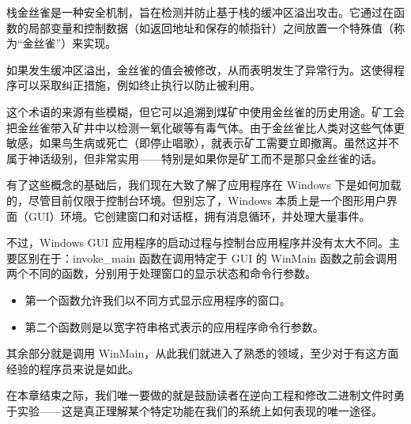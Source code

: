 栈金丝雀是一种安全机制，旨在检测并防止基于栈的缓冲区溢出攻击。它通过在函数的局部变量和控制数据（如返回地址和保存的帧指针）之间放置一个特殊值（称为“金丝雀”）来实现。

如果发生缓冲区溢出，金丝雀的值会被修改，从而表明发生了异常行为。这使得程序可以采取纠正措施，例如终止执行以防止被利用。

这个术语的来源有些模糊，但它可以追溯到煤矿中使用金丝雀的历史用途。矿工会把金丝雀带入矿井中以检测一氧化碳等有毒气体。由于金丝雀比人类对这些气体更敏感，如果鸟生病或死亡（即停止唱歌），就表示矿工需要立即撤离。虽然这并不属于神话级别，但非常实用——特别是如果你是矿工而不是那只金丝雀的话。

有了这些概念的基础后，我们现在大致了解了应用程序在 Windows 下是如何加载的，尽管目前仅限于控制台环境。但别忘了，Windows 本质上是一个图形用户界面（GUI）环境。它创建窗口和对话框，拥有消息循环，并处理大量事件。

不过，Windows GUI 应用程序的启动过程与控制台应用程序并没有太大不同。主要区别在于：invoke\_main 函数在调用特定于 GUI 的 WinMain 函数之前会调用两个不同的函数，分别用于处理窗口的显示状态和命令行参数。

\begin{itemize}
\item 
第一个函数允许我们以不同方式显示应用程序的窗口。

\item 
第二个函数则是以宽字符串格式表示的应用程序命令行参数。
\end{itemize}

其余部分就是调用 WinMain，从此我们就进入了熟悉的领域，至少对于有这方面经验的程序员来说是如此。

在本章结束之际，我们唯一要做的就是鼓励读者在逆向工程和修改二进制文件时勇于实验——这是真正理解某个特定功能在我们的系统上如何表现的唯一途径。





